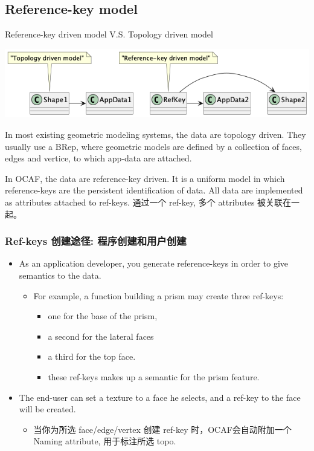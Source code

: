 \documentclass[11pt]{article}
\begin{document}
\subsection{Reference-key model}
\label{sec:orgf9e511b}

Reference-key driven model V.S. Topology driven model

\begin{center}
\includegraphics[width=.9\linewidth]{img/reference-key-model.png}
\end{center}

In most existing geometric modeling systems, the data are topology driven. They usually use a BRep, where geometric models are defined by a collection of faces, edges and vertice, to which app-data are attached.

In OCAF, the data are reference-key driven. It is a uniform model in which reference-keys are the persistent identification of data. All data are implemented as attributes attached to ref-keys. 通过一个 ref-key, 多个 attributes 被关联在一起。
\subsubsection{Ref-keys 创建途径: 程序创建和用户创建}
\label{sec:org35e2055}

\begin{itemize}
\item As an application developer, you generate reference-keys in order to give semantics to the data.
\begin{itemize}
\item For example, a function building a prism may create three ref-keys:
\begin{itemize}
\item one for the base of the prism,
\item a second for the lateral faces
\item a third for the top face.
\item these ref-keys makes up a semantic for the prism feature.
\end{itemize}
\end{itemize}
\item The end-user can set a texture to a face he selects, and a ref-key to the face will be created.
\begin{itemize}
\item 当你为所选 face/edge/vertex 创建 ref-key 时，OCAF会自动附加一个 Naming attribute, 用于标注所选 topo.
\end{itemize}
\end{itemize}
\end{document}
